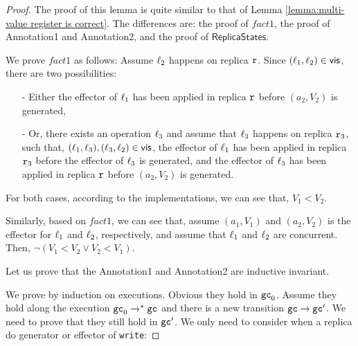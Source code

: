 \begin {proof}

The proof of this lemma is quite similar to that of Lemma \ref{lemma:multi-value register is correct}. The differences are: the proof of $fact1$, the proof of Annotation1 and Annotation2, and the proof of $\mathsf{ReplicaStates}$.

We prove $fact1$ as follows: Assume $\ell_2$ happens on replica $\mathtt{r}$. Since $(\ell_1,\ell_2) \in \mathsf{vis}$, there are two possibilities:

\begin{itemize}
\setlength{\itemsep}{0.5pt}
\item[-] Either the effector of $\ell_1$ has been applied in replica $\mathtt{r}$ before $(a_2,V_2)$ is generated,

\item[-] Or, there exists an operation $\ell_3$ and assume that $\ell_3$ happens on replica $\mathtt{r}_3$, such that, $(\ell_1,\ell_3),(\ell_3,\ell_2) \in \mathsf{vis}$, the effector of $\ell_1$ has been applied in replica $\mathtt{r}_3$ before the effector of $\ell_3$ is generated, and the effector of $\ell_3$ has been applied in replica $\mathtt{r}$ before $(a_2,V_2)$ is generated.
\end{itemize}

For both cases, according to the implementations, we can see that, $V_1 < V_2$.

Similarly, based on $fact1$, we can see that, assume $(a_1,V_1)$ and $(a_2,V_2)$ is the effector for $\ell_1$ and $\ell_2$, respectively, and assume that $\ell_1$ and $\ell_2$ are concurrent. Then, $\neg (V_1 < V_2 \vee V_2 < V_1)$.





Let us prove that the Annotation1 and Annotation2 are inductive invariant.

We prove by induction on executions. Obvious they hold in $\mathtt{gc}_0$. Assume they hold along the execution $\mathtt{gc}_0 \xrightarrow{}^* \mathtt{gc}$ and there is a new transition $\mathtt{gc} \xrightarrow{} \mathtt{gc}'$. We need to prove that they still hold in $\mathtt{gc}'$. We only need to consider when a replica do generator or effector of {\tt write}:


\end{proof}

